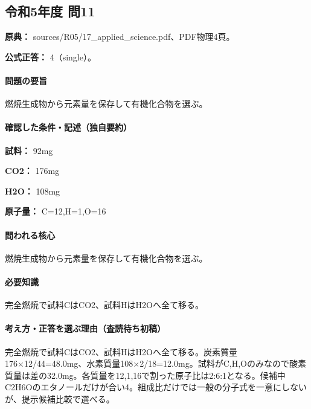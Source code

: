 \subsection{令和5年度 問11}
\label{q:r05-reg-applied-11}

\noindent\textbf{原典：} sources/R05/17\_applied\_science.pdf、PDF物理4頁。

\textbf{公式正答：} 4（single）。

\paragraph{問題の要旨} 燃焼生成物から元素量を保存して有機化合物を選ぶ。

\paragraph{確認した条件・記述（独自要約）}\mbox{}\par

\noindent\textbf{試料：} 92mg\par

\noindent\textbf{CO2：} 176mg\par

\noindent\textbf{H2O：} 108mg\par

\noindent\textbf{原子量：} C=\allowbreak{}12,H=\allowbreak{}1,O=\allowbreak{}16\par

\paragraph{問われる核心} 燃焼生成物から元素量を保存して有機化合物を選ぶ。

\paragraph{必要知識} 完全燃焼で試料CはCO2、試料HはH2Oへ全て移る。

\paragraph{考え方・正答を選ぶ理由（査読待ち初稿）} 完全燃焼で試料CはCO2、試料HはH2Oへ全て移る。炭素質量176×12/44=\allowbreak{}48.0mg、水素質量108×2/18=\allowbreak{}12.0mg。試料がC,H,Oのみなので酸素質量は差の32.0mg。各質量を12,1,16で割った原子比は2:6:1となる。候補中C2H6Oのエタノールだけが合い4。組成比だけでは一般の分子式を一意にしないが、提示候補比較で選べる。

